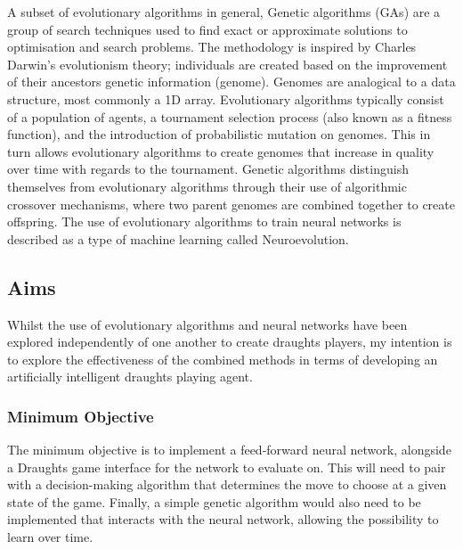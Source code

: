 \documentclass[12pt,a4paper]{article}
\begin{document}
    A subset of evolutionary algorithms in general, Genetic algorithms (GAs) are a group of search techniques used to find exact or approximate solutions to optimisation and search problems. The methodology is inspired by Charles Darwin's evolutionism theory; individuals are created based on the improvement of their ancestors genetic information (genome). Genomes are analogical to a data structure, most commonly a 1D array. Evolutionary algorithms typically consist of a population of agents, a tournament selection process (also known as a fitness function), and the introduction of probabilistic mutation on genomes. This in turn allows evolutionary algorithms to create genomes that increase in quality over time with regards to the tournament. Genetic algorithms distinguish themselves from evolutionary algorithms through their use of algorithmic crossover mechanisms, where two parent genomes are combined together to create offspring. The use of evolutionary algorithms to train neural networks is described as a type of machine learning called Neuroevolution.

    \subsection{Aims}

    Whilst the use of evolutionary algorithms and neural networks have been explored independently of one another to create draughts players, my intention is to explore the effectiveness of the combined methods in terms of developing an artificially intelligent draughts playing agent. 

    \subsubsection{Minimum Objective}
        The minimum objective is to implement a feed-forward neural network, alongside a Draughts game interface for the network to evaluate on. This will need to pair with a decision-making algorithm that determines the move to choose at a given state of the game. Finally, a simple genetic algorithm would also need to be implemented that interacts with the neural network, allowing the possibility to learn over time.
\end{document}
